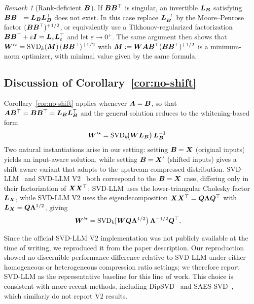 \documentclass[10pt]{article} %
\theoremstyle{definition}
\theoremstyle{remark}
\newtheorem*{remark*}{Remark}
\begin{document}
\begin{remark*}[Rank-deficient ${\bm{B}}$]
If ${\bm{B}}{\bm{B}}^\top$ is singular, an invertible ${\bm{L}}_{\bm{B}}$ satisfying ${\bm{B}}{\bm{B}}^\top = {\bm{L}}_{\bm{B}}{\bm{L}}_{\bm{B}}^\top$ does not exist.
In this case replace ${\bm{L}}_{\bm{B}}^{-1}$ by the Moore--Penrose factor $({\bm{B}}{\bm{B}}^\top)^{+1/2}$,
or equivalently use a Tikhonov-regularized factorization
${\bm{B}}{\bm{B}}^\top+\varepsilon {\bm{I}} = {\bm{L}}_\varepsilon{\bm{L}}_\varepsilon^\top$ and let
$\varepsilon\to 0^+$. The same argument then shows that
${\bm{W}}'^{\star} = \operatorname{SVD}_k({\bm{M}})\,({\bm{B}}{\bm{B}}^\top)^{+1/2}$
with ${\bm{M}} := {\bm{W}}{\bm{A}}{\bm{B}}^\top({\bm{B}}{\bm{B}}^\top)^{+1/2}$
is a minimum-norm optimizer, with minimal value given by the same formula.
\end{remark*}

\subsection{Discussion of Corollary~\ref{cor:no-shift}}

Corollary~\ref{cor:no-shift} applies whenever ${\bm{A}} = {\bm{B}}$, so that ${\bm{A}}{\bm{B}}^\top = {\bm{B}}{\bm{B}}^\top = {\bm{L}}_{\bm{B}}{\bm{L}}_{\bm{B}}^\top$ and the general solution reduces to the whitening-based form
\[
{\bm{W}}'^{\star} = \operatorname{SVD}_k\!\bigl({\bm{W}}{\bm{L}}_{\bm{B}}\bigr)\,{\bm{L}}_{\bm{B}}^{-1}.
\]
Two natural instantiations arise in our setting: setting ${\bm{B}} = {\bm{X}}$ (original inputs) yields an input-aware solution, while setting ${\bm{B}} = {\bm{X}}'$ (shifted inputs) gives a shift-aware variant that adapts to the upstream-compressed distribution.
SVD-LLM~\citep{wang2025svdllm} and SVD-LLM V2~\citep{wang2025svdllmv2} both correspond to the ${\bm{B}} = {\bm{X}}$ case, differing only in their factorization of ${\bm{X}}{\bm{X}}^\top$: SVD-LLM uses the lower-triangular Cholesky factor ${\bm{L}}_{\bm{X}}$, while SVD-LLM V2 uses the eigendecomposition ${\bm{X}}{\bm{X}}^\top = {\bm{Q}}{\bm{\Lambda}}{\bm{Q}}^\top$ with ${\bm{L}}_{\bm{X}} = {\bm{Q}}{\bm{\Lambda}}^{1/2}$, giving
\[
{\bm{W}}'^{\star} = \operatorname{SVD}_k\!\bigl({\bm{W}}{\bm{Q}}{\bm{\Lambda}}^{1/2}\bigr)\,{\bm{\Lambda}}^{-1/2}{\bm{Q}}^\top.
\]

Since the official SVD-LLM V2 implementation was not publicly available at the time of 
writing, we reproduced it from the paper description. Our reproduction showed no discernible 
performance difference relative to SVD-LLM under either homogeneous or heterogeneous compression 
ratio settings; we therefore report SVD-LLM as the representative baseline for this line of work. 
This choice is consistent with more recent methods, including DipSVD~\citep{ding2025dipsvd} 
and SAES-SVD~\citep{hu2026saes}, which similarly do not report V2 results.
\end{document}
